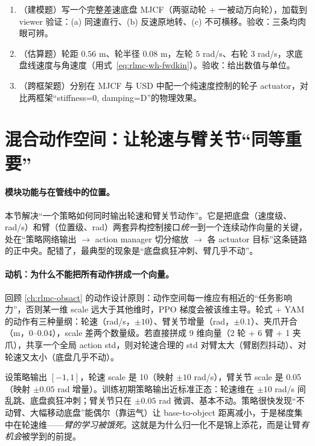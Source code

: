 \begin{practice}[底盘建模]
\begin{enumerate}
\item （建模题）写一个完整差速底盘 MJCF（两驱动轮 + 一被动万向轮），加载到 viewer 验证：(a) 同速直行、(b) 反速原地转、(c) 不可横移。验收：三条均肉眼可辨。
\item （估算题）轮距 $0.56$ m、轮半径 $0.08$ m，左轮 $5$ rad/s、右轮 $3$ rad/s，求底盘线速度与角速度（用式~\eqref{eq:rlmc-wh-fwdkin}）。验收：给出数值与单位。
\item （跨框架题）分别在 MJCF 与 USD 中配一个纯速度控制的轮子 actuator，对比两框架“stiffness=0, damping=D”的物理效果。
\end{enumerate}
\end{practice}

\section{混合动作空间：让轮速与臂关节“同等重要”}
\label{sec:rlmc-wh-action}

\paragraph{模块功能与在管线中的位置。}本节解决“一个策略如何同时输出轮速和臂关节动作”。它是把底盘（速度级、rad/s）和臂（位置级、rad）两套异构控制接口\emph{统一}到一个连续动作向量的关键，处在“策略网络输出 $\to$ action manager 切分缩放 $\to$ 各 actuator 目标”这条链路的正中央。配错了，最典型的现象是“底盘疯狂冲刺、臂几乎不动”。

\paragraph{动机：为什么不能把所有动作拼成一个向量。}回顾 \cref{ch:rlmc-obsact} 的动作设计原则：动作空间每一维应有相近的“任务影响力”，否则某一维 scale 远大于其他维时，PPO 梯度会被该维主导。轮式 + YAM 的动作有三种量纲：轮速（rad/s，$\pm 10$）、臂关节增量（rad，$\pm 0.1$）、夹爪开合（m，$0$--$0.04$），scale 差两个数量级。若直接拼成 9 维向量（2 轮 + 6 臂 + 1 夹爪），共享一个全局 action std，则对轮速合理的 std 对臂太大（臂剧烈抖动）、对轮速又太小（底盘几乎不动）。

\begin{insight}\label{ins:rlmc-wh-starve}
设策略输出 $[-1,1]$，轮速 scale 是 10（映射 $\pm 10$ rad/s），臂关节 scale 是 0.05（映射 $\pm 0.05$ rad 增量）。训练初期策略输出近标准正态：轮速维在 $\pm 10$ rad/s 间乱跳、底盘疯狂冲刺；臂关节只在 $\pm 0.05$ rad 微调、基本不动。策略很快发现“不动臂、大幅移动底盘”能偶尔（靠运气）让 base-to-object 距离减小，于是梯度集中在轮速维——\emph{臂的学习被饿死}。这就是为什么归一化不是锦上添花，而是让臂\emph{有机会}被学到的前提。
\end{insight}

